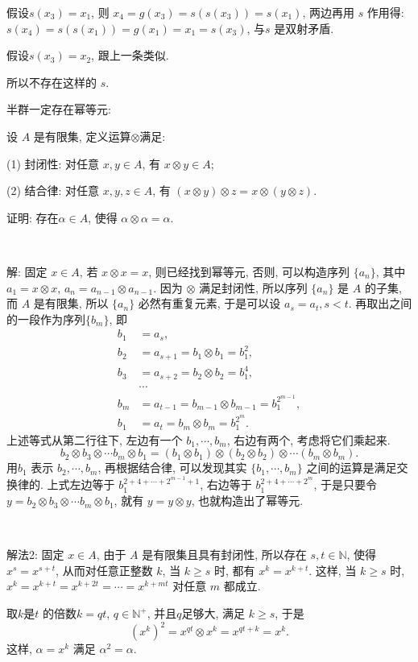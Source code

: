 假设$s(x_3)=x_1$, 则 $x_4 = g(x_3)=s(s(x_3))=s(x_1)$, 两边再用 $s$ 作用得: $s(x_4) = s(s(x_1)) = g(x_1)=x_1=s(x_3)$, 与$s$ 是双射矛盾. 

假设$s(x_3)=x_2$, 跟上一条类似.

所以不存在这样的 $s$.


\newpage
\noindent 半群一定存在幂等元:

设 $A$ 是有限集, 定义运算$\otimes$满足:

(1) 封闭性: 对任意 $x,y\in A$, 有 $x\otimes y\in A$;

(2) 结合律: 对任意 $x,y,z\in A$, 有 $(x\otimes y)\otimes z = x\otimes(y\otimes z)$.

证明: 存在$\alpha\in A$, 使得 $\alpha\otimes\alpha=\alpha$.


~

解: 固定 $x\in A$, 若 $x\otimes x = x$, 则已经找到幂等元, 否则, 可以构造序列 $\{a_n\}$, 其中 $a_1=x\otimes x$, $a_{n}=a_{n-1}\otimes a_{n-1}$. 因为 $\otimes$ 满足封闭性, 所以序列 $\{a_n\}$ 是 $A$ 的子集, 而 $A$  是有限集, 所以 $\{a_n\}$ 必然有重复元素, 于是可以设 $a_s = a_t, s<t$. 再取出之间的一段作为序列$\{b_m\}$, 即
\begin{align*}
b_1&=a_s,\\ 
b_2&=a_{s+1}=b_1\otimes b_1 = b_1^2,\\ 
b_3&=a_{s+2}=b_2\otimes b_2 = b_1^4,\\
&\cdots\\ 
b_m&=a_{t-1} = b_{m-1}\otimes b_{m-1} = b_1^{2^{m-1}},\\
b_1&=a_t=b_{m}\otimes b_m=b_1^{2^m}.
\end{align*}
上述等式从第二行往下, 左边有一个 $b_1, \cdots, b_m$, 右边有两个, 考虑将它们乘起来.
\[b_2\otimes b_3\otimes\cdots b_m\otimes b_1 = (b_1\otimes b_1)\otimes(b_2\otimes b_2)\otimes\cdots(b_m\otimes b_m).\]
用$b_1$ 表示 $b_2,\cdots,b_m$, 再根据结合律, 可以发现其实 $\{b_1, \cdots, b_m\}$ 之间的运算是满足交换律的. 上式左边等于 $b_1^{2+4+\cdots+2^{m-1}+1}$, 右边等于 $b_1^{2+4+\cdots+2^m}$, 于是只要令 $y=b_2\otimes b_3\otimes\cdots b_m\otimes b_1$, 就有 $y=y\otimes y$, 也就构造出了幂等元.

~

解法2: 固定 $x\in A$, 由于 $A$ 是有限集且具有封闭性, 所以存在 $s,t\in\mathbb{N}$, 使得 $x^s = x^{s+t}$, 从而对任意正整数 $k$, 当 $k\ge s$ 时, 都有 $x^k=x^{k+t}$. 这样, 当 $k\ge s$ 时, $x^k=x^{k+t}=x^{k+2t}=\cdots=x^{k+mt}$ 对任意 $m$ 都成立.

取$k$是$t$ 的倍数$k=qt$, $q\in\mathbb{N}^+$, 并且$q$足够大, 满足 $k\ge s$, 于是
\[ (x^k)^2 = x^{qt}\otimes x^k=x^{qt+k}=x^k .\]
这样, $\alpha=x^k$ 满足 $\alpha^2=\alpha$.

